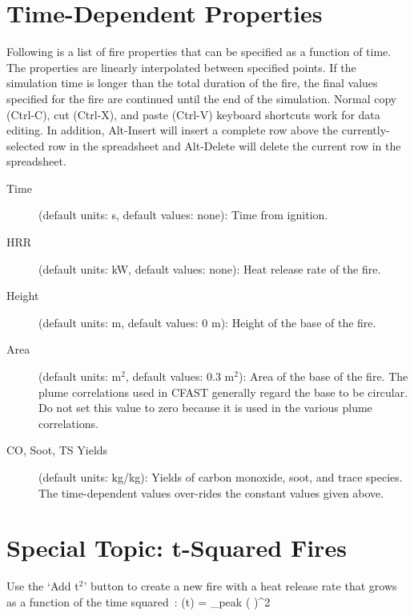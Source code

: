 \section{Time-Dependent Properties}

Following is a list of fire properties that can be specified as a function of time. The properties are linearly interpolated between specified points. If the simulation time is longer than the total duration of the fire, the final values specified for the fire are continued until the end of the simulation. Normal copy (Ctrl-C), cut (Ctrl-X), and paste (Ctrl-V) keyboard shortcuts work for data editing. In addition, Alt-Insert will insert a complete row above the currently-selected row in the spreadsheet and Alt-Delete will delete the current row in the spreadsheet.
\begin{description}
\item[Time] (default units: s, default values: none): Time from ignition.
\item[HRR] (default units: kW, default values: none): Heat release rate of the fire.
\item[Height] (default units: m, default values: 0 m): Height of the base of the fire.
\item[Area] (default units: m$^2$, default values: 0.3 m$^2$): Area of the base of the fire. The plume correlations used in CFAST generally regard the base to be circular. Do not set this value to zero because it is used in the various plume correlations.
\item[CO, Soot, TS Yields] (default units: kg/kg): Yields of carbon monoxide, soot, and trace species. The time-dependent values over-rides the constant values given above.
\end{description}



\section{Special Topic: t-Squared Fires}
\label{tsq}

Use the `Add t$^2$' button to create a new fire with a heat release rate that grows as a function of the time squared~\cite{Schifiliti:2002}:
\be
   \dQ(t) = \dQ_{\rm peak} \; \left(  \right)^2
\ee

